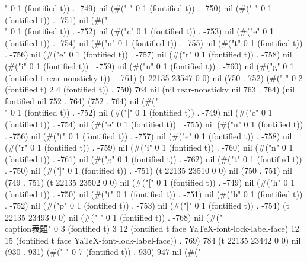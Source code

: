 " 0 1 (fontified t)) . -749) nil (#(" " 0 1 (fontified t)) . -750) nil (#(" " 0 1 (fontified t)) . -751) nil (#("\\" 0 1 (fontified t)) . -752) nil (#("c" 0 1 (fontified t)) . -753) nil (#("e" 0 1 (fontified t)) . -754) nil (#("n" 0 1 (fontified t)) . -755) nil (#("t" 0 1 (fontified t)) . -756) nil (#("e" 0 1 (fontified t)) . -757) nil (#("r" 0 1 (fontified t)) . -758) nil (#("i" 0 1 (fontified t)) . -759) nil (#("n" 0 1 (fontified t)) . -760) nil (#("g" 0 1 (fontified t rear-nonsticky t)) . -761) (t 22135 23547 0 0) nil (750 . 752) (#("   	" 0 2 (fontified t) 2 4 (fontified t)) . 750) 764 nil (nil rear-nonsticky nil 763 . 764) (nil fontified nil 752 . 764) (752 . 764) nil (#("\\" 0 1 (fontified t)) . -752) nil (#("[" 0 1 (fontified t)) . -749) nil (#("c" 0 1 (fontified t)) . -754) nil (#("e" 0 1 (fontified t)) . -755) nil (#("n" 0 1 (fontified t)) . -756) nil (#("t" 0 1 (fontified t)) . -757) nil (#("e" 0 1 (fontified t)) . -758) nil (#("r" 0 1 (fontified t)) . -759) nil (#("i" 0 1 (fontified t)) . -760) nil (#("n" 0 1 (fontified t)) . -761) nil (#("g" 0 1 (fontified t)) . -762) nil (#("t" 0 1 (fontified t)) . -750) nil (#("]" 0 1 (fontified t)) . -751) (t 22135 23510 0 0) nil (750 . 751) nil (749 . 751) (t 22135 23502 0 0) nil (#("[" 0 1 (fontified t)) . -749) nil (#("h" 0 1 (fontified t)) . -750) nil (#("t" 0 1 (fontified t)) . -751) nil (#("b" 0 1 (fontified t)) . -752) nil (#("p" 0 1 (fontified t)) . -753) nil (#("]" 0 1 (fontified t)) . -754) (t 22135 23493 0 0) nil (#("
" 0 1 (fontified t)) . -768) nil (#("   \\caption{表題}" 0 3 (fontified t) 3 12 (fontified t face YaTeX-font-lock-label-face) 12 15 (fontified t face YaTeX-font-lock-label-face)) . 769) 784 (t 22135 23442 0 0) nil (930 . 931) (#("       " 0 7 (fontified t)) . 930) 947 nil (#("
